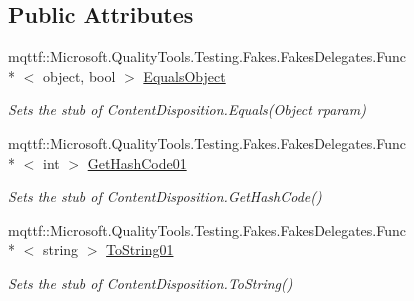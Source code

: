 \subsection*{Public Attributes}
\begin{DoxyCompactItemize}
\item 
mqttf\-::\-Microsoft.\-Quality\-Tools.\-Testing.\-Fakes.\-Fakes\-Delegates.\-Func\\*
$<$ object, bool $>$ \hyperlink{class_system_1_1_net_1_1_mime_1_1_fakes_1_1_stub_content_disposition_ab13ea731cfda94600033a31e8dc96f76}{Equals\-Object}
\begin{DoxyCompactList}\small\item\em Sets the stub of Content\-Disposition.\-Equals(\-Object rparam)\end{DoxyCompactList}\item 
mqttf\-::\-Microsoft.\-Quality\-Tools.\-Testing.\-Fakes.\-Fakes\-Delegates.\-Func\\*
$<$ int $>$ \hyperlink{class_system_1_1_net_1_1_mime_1_1_fakes_1_1_stub_content_disposition_a4f7270d1fd3d95ca7898861bdc923af0}{Get\-Hash\-Code01}
\begin{DoxyCompactList}\small\item\em Sets the stub of Content\-Disposition.\-Get\-Hash\-Code()\end{DoxyCompactList}\item 
mqttf\-::\-Microsoft.\-Quality\-Tools.\-Testing.\-Fakes.\-Fakes\-Delegates.\-Func\\*
$<$ string $>$ \hyperlink{class_system_1_1_net_1_1_mime_1_1_fakes_1_1_stub_content_disposition_aa3c609c9a6f04af71303ca36a4f4120c}{To\-String01}
\begin{DoxyCompactList}\small\item\em Sets the stub of Content\-Disposition.\-To\-String()\end{DoxyCompactList}\end{DoxyCompactItemize}
